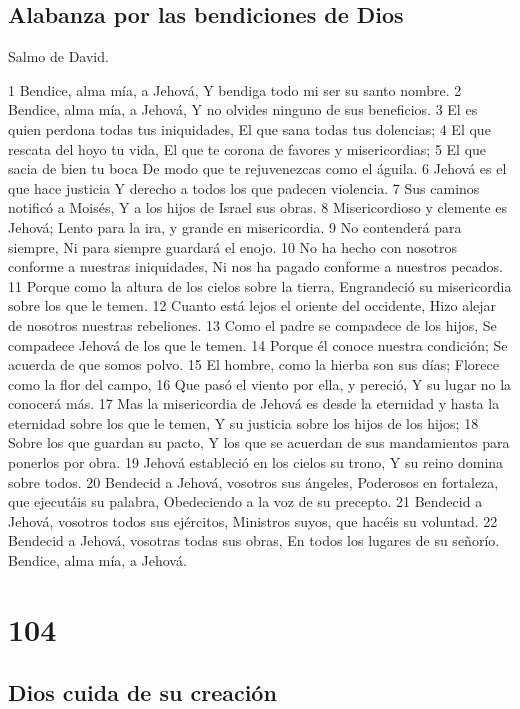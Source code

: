\section*{Alabanza por las bendiciones de Dios}

Salmo de David.

1 Bendice, alma mía, a Jehová,
Y bendiga todo mi ser su santo nombre.
2 Bendice, alma mía, a Jehová,
Y no olvides ninguno de sus beneficios.
3 El es quien perdona todas tus iniquidades,
El que sana todas tus dolencias;
4 El que rescata del hoyo tu vida,
El que te corona de favores y misericordias;
5 El que sacia de bien tu boca
De modo que te rejuvenezcas como el águila.
6 Jehová es el que hace justicia
Y derecho a todos los que padecen violencia.
7 Sus caminos notificó a Moisés,
Y a los hijos de Israel sus obras.
8 Misericordioso y clemente es Jehová;
Lento para la ira, y grande en misericordia.
9 No contenderá para siempre,
Ni para siempre guardará el enojo.
10 No ha hecho con nosotros conforme a nuestras iniquidades,
Ni nos ha pagado conforme a nuestros pecados.
11 Porque como la altura de los cielos sobre la tierra,
Engrandeció su misericordia sobre los que le temen.
12 Cuanto está lejos el oriente del occidente,
Hizo alejar de nosotros nuestras rebeliones.
13 Como el padre se compadece de los hijos,
Se compadece Jehová de los que le temen.
14 Porque él conoce nuestra condición;
Se acuerda de que somos polvo.
15 El hombre, como la hierba son sus días;
Florece como la flor del campo,
16 Que pasó el viento por ella, y pereció,
Y su lugar no la conocerá más.
17 Mas la misericordia de Jehová es desde la eternidad y hasta la eternidad sobre los que le temen,
Y su justicia sobre los hijos de los hijos;
18 Sobre los que guardan su pacto,
Y los que se acuerdan de sus mandamientos para ponerlos por obra.
19 Jehová estableció en los cielos su trono,
Y su reino domina sobre todos.
20 Bendecid a Jehová, vosotros sus ángeles,
Poderosos en fortaleza, que ejecutáis su palabra,
Obedeciendo a la voz de su precepto.
21 Bendecid a Jehová, vosotros todos sus ejércitos,
Ministros suyos, que hacéis su voluntad.
22 Bendecid a Jehová, vosotras todas sus obras,
En todos los lugares de su señorío.
Bendice, alma mía, a Jehová.

\chapter{104}

\section*{Dios cuida de su creación}

